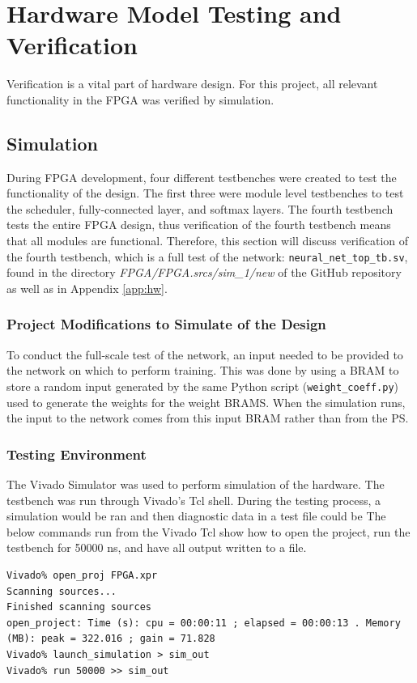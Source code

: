 \chapter{Hardware Model Testing and Verification}\label{hw-model-testing}
Verification is a vital part of hardware design. For this project, all relevant functionality in the FPGA was verified by simulation.
\section{Simulation}
During FPGA development, four different testbenches were created to test the functionality of the design. The first three were module level testbenches to test the scheduler, fully-connected layer, and softmax layers. The fourth testbench tests the entire FPGA design, thus verification of the fourth testbench means that all modules are functional. Therefore, this section will discuss verification of the fourth testbench, which is a full test of the network: \texttt{neural\_net\_top\_tb.sv}, found in the directory \textit{FPGA/FPGA.srcs/sim\_1/new} of the GitHub repository as well as in Appendix \ref{app:hw}.

\subsection{Project Modifications to Simulate of the Design}
To conduct the full-scale test of the network, an input needed to be provided to the network on which to perform training. This was done by using a BRAM to store a random input generated by the same Python script (\texttt{weight\_coeff.py}) used to generate the weights for the weight BRAMS. When the simulation runs, the input to the network comes from this input BRAM rather than from the PS.

\subsection{Testing Environment}
The Vivado Simulator was used to perform simulation of the hardware. The testbench was run through Vivado's Tcl shell. During the testing process, a simulation would be ran and then diagnostic data in a test file could be  The below commands run from the Vivado Tcl show how to open the project, run the testbench for 50000 ns, and have all output written to a file.
\begin{lstlisting}
Vivado% open_proj FPGA.xpr
Scanning sources...
Finished scanning sources
open_project: Time (s): cpu = 00:00:11 ; elapsed = 00:00:13 . Memory (MB): peak = 322.016 ; gain = 71.828
Vivado% launch_simulation > sim_out
Vivado% run 50000 >> sim_out
\end{lstlisting}

